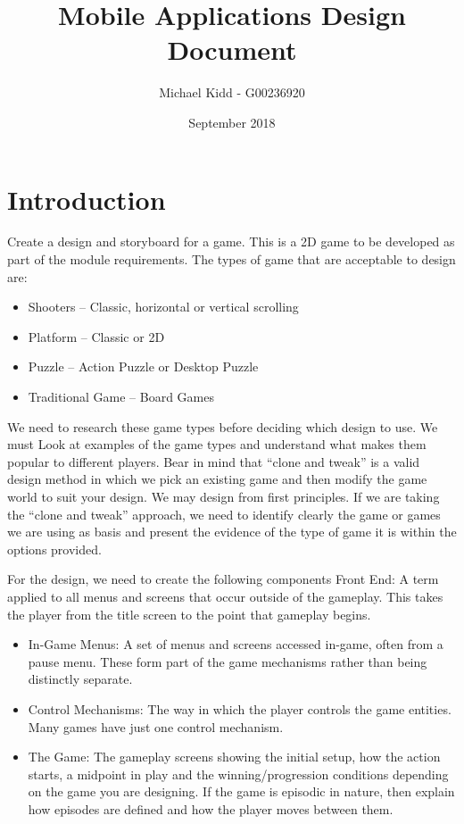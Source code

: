 \documentclass{article}
\title{Mobile Applications Design Document}
\author{Michael Kidd - G00236920}
\date{September 2018}
\begin{document}
 

\maketitle
\clearpage

\tableofcontents
\clearpage 

\section{Introduction}
Create a design and storyboard for a game.  This is a 2D game to be developed as part of the module requirements.  The types of game that are acceptable to design are: 

\begin{itemize}
  \item Shooters – Classic, horizontal or vertical scrolling 
  \item Platform – Classic or 2D 
  \item Puzzle – Action Puzzle or Desktop Puzzle 
  \item Traditional Game – Board Games 
\end{itemize}

We need to research these game types before deciding which design to use.  We must Look at examples of the game types and understand what makes them popular to different players.  Bear in mind that “clone and tweak” is a valid design method in which we pick an existing game and then modify the game world to suit your design. We may design from first principles. 
If we are taking the “clone and tweak” approach, we need to identify clearly the game or games we are using as basis and present the evidence of the type of game it is within the options provided.   \newline
 
For the design, we need to create the following components 
Front End: A term applied to all menus and screens that occur outside of the gameplay.  This takes the player from the title screen to the point that gameplay begins. 

\begin{itemize}
	\item In-Game Menus: A set of menus and screens accessed in-game, often from a pause menu.  These form part of the game mechanisms rather than being distinctly separate. 
	\item Control Mechanisms: The way in which the player controls the game entities.  Many games have just one control mechanism.
	\item The Game: The gameplay screens showing the initial setup, how the action starts, a midpoint in play and the winning/progression conditions depending on the game you are designing.  If the game is episodic in nature, then explain how episodes are defined and how the player moves between them. 
\end{itemize}
\end{document}

